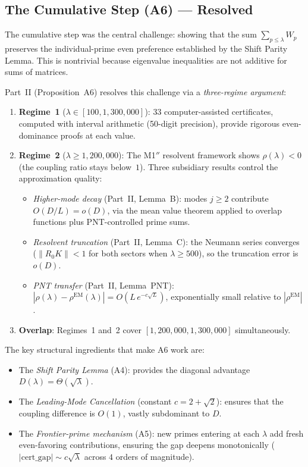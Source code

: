 \documentclass[12pt,a4paper]{article}
\theoremstyle{definition}
\theoremstyle{remark}
\begin{document}
\subsection{The Cumulative Step (A6) --- Resolved}

The cumulative step was the central challenge: showing that the sum $\sum_{p \leq \lambda} W_p$ preserves the individual-prime even preference established by the Shift Parity Lemma. This is nontrivial because eigenvalue inequalities are not additive for sums of matrices.

Part~II (Proposition~A6) resolves this challenge via a \emph{three-regime argument}:

\begin{enumerate}
  \item \textbf{Regime~1} ($\lambda \in [100, 1{,}300{,}000]$): $33$ computer-assisted certificates, computed with interval arithmetic (50-digit precision), provide rigorous even-dominance proofs at each value.
  \item \textbf{Regime~2} ($\lambda \geq 1{,}200{,}000$): The M1$''$ resolvent framework shows $\rho(\lambda) < 0$ (the coupling ratio stays below~$1$). Three subsidiary results control the approximation quality:
  \begin{itemize}
    \item \emph{Higher-mode decay} (Part~II, Lemma~B): modes $j \geq 2$ contribute $O(D/L) = o(D)$, via the mean value theorem applied to overlap functions plus PNT-controlled prime sums.
    \item \emph{Resolvent truncation} (Part~II, Lemma~C): the Neumann series converges ($\|R_0 K\| < 1$ for both sectors when $\lambda \geq 500$), so the truncation error is $o(D)$.
    \item \emph{PNT transfer} (Part~II, Lemma~PNT): $|\rho(\lambda) - \rho^{\mathrm{EM}}(\lambda)| = O(L\,e^{-c\sqrt{L}})$, exponentially small relative to $|\rho^{\mathrm{EM}}|$.
  \end{itemize}
  \item \textbf{Overlap}: Regimes~1 and~2 cover $[1{,}200{,}000, 1{,}300{,}000]$ simultaneously.
\end{enumerate}

\noindent The key structural ingredients that make A6 work are:
\begin{itemize}
  \item The \emph{Shift Parity Lemma} (A4): provides the diagonal advantage $D(\lambda) = \Theta(\sqrt{\lambda})$.
  \item The \emph{Leading-Mode Cancellation} (constant $c = 2 + \sqrt{2}$): ensures that the coupling difference is $O(1)$, vastly subdominant to $D$.
  \item The \emph{Frontier-prime mechanism} (A5): new primes entering at each $\lambda$ add fresh even-favoring contributions, ensuring the gap deepens monotonically ($|\mathrm{cert\_gap}| \sim c\sqrt{\lambda}$ across $4$ orders of magnitude).
\end{itemize}
\end{document}
